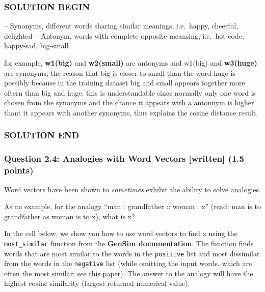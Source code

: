 \documentclass[11pt]{article}
\begin{document}
    \subsubsection{SOLUTION BEGIN}\label{solution-begin}

-- Synonyms, different words sharing similar meanings, i.e.~happy,
cheerful, delighted -- Antonym, words with complete opposite meansing,
i.e.~hot-code, happy-sad, big-small

for example, \textbf{w1(big)} and \textbf{w2(small)} are antonyms and
w1(big) and \textbf{w3(huge)} are synonyms, the reason that big is
closer to small than the word huge is possibly because in the training
dataset big and small appears together more oftern than big and huge,
this is understandable since normally only one word is chosen from the
synonyms and the chance it appears with a antonnym is higher thant it
appears with another synonyms, thus explains the cosine distance result.

\subsubsection{SOLUTION END}\label{solution-end}

    \subsubsection{Question 2.4: Analogies with Word Vectors {[}written{]}
(1.5
points)}\label{question-2.4-analogies-with-word-vectors-written-1.5-points}

Word vectors have been shown to \emph{sometimes} exhibit the ability to
solve analogies.

As an example, for the analogy ``man : grandfather :: woman : x'' (read:
man is to grandfather as woman is to x), what is x?

In the cell below, we show you how to use word vectors to find x using
the \texttt{most\_similar} function from the
\textbf{\href{https://radimrehurek.com/gensim/models/keyedvectors.html\#gensim.models.keyedvectors.KeyedVectors.most_similar}{GenSim
documentation}}. The function finds words that are most similar to the
words in the \texttt{positive} list and most dissimilar from the words
in the \texttt{negative} list (while omitting the input words, which are
often the most similar; see
\href{https://www.aclweb.org/anthology/N18-2039.pdf}{this paper}). The
answer to the analogy will have the highest cosine similarity (largest
returned numerical value).
\end{document}
